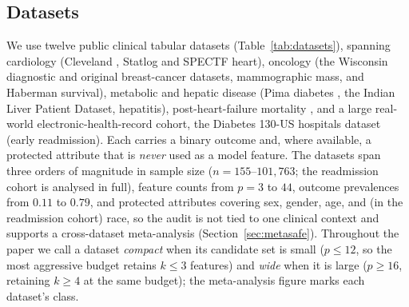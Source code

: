 \documentclass[fleqn,10pt]{wlscirep}
\begin{document}
\subsection{Datasets}
\label{sec:datasets}
We use twelve public clinical tabular datasets (Table~\ref{tab:datasets}), spanning cardiology
(Cleveland \cite{detrano1989international}, Statlog and SPECTF heart), oncology (the Wisconsin
diagnostic \cite{street1993nuclear} and original breast-cancer datasets, mammographic mass, and
Haberman survival), metabolic and hepatic disease (Pima diabetes \cite{smith1988using}, the Indian
Liver Patient Dataset, hepatitis), post-heart-failure mortality \cite{chicco2020machine}, and a
large real-world electronic-health-record cohort, the Diabetes 130-US hospitals dataset
\cite{strack2014impact} (early readmission). Each carries a binary outcome and, where available, a protected attribute that is
\emph{never} used as a model feature. The datasets span three orders of magnitude in sample size
($n=155$--$101{,}763$; the readmission cohort is analysed in full), feature counts from $p=3$ to
$44$, outcome prevalences from $0.11$ to $0.79$,
and protected attributes covering sex, gender, age, and (in the readmission cohort) race, so the
audit is not tied to one clinical context and supports a cross-dataset meta-analysis
(Section~\ref{sec:metasafe}). Throughout the paper we call a dataset \emph{compact} when its
candidate set is small ($p\le 12$, so the most aggressive budget retains $k\le 3$ features) and
\emph{wide} when it is large ($p\ge 16$, retaining $k\ge 4$ at the same budget); the meta-analysis
figure marks each dataset's class.

\begin{table}[t]
\centering
\caption{Datasets. Prevalence is the positive-class rate; $p$ is the number of model features
(the protected attribute is excluded from the features). All are publicly available; see
Data availability.}
\label{tab:datasets}

\end{table}
\end{document}
